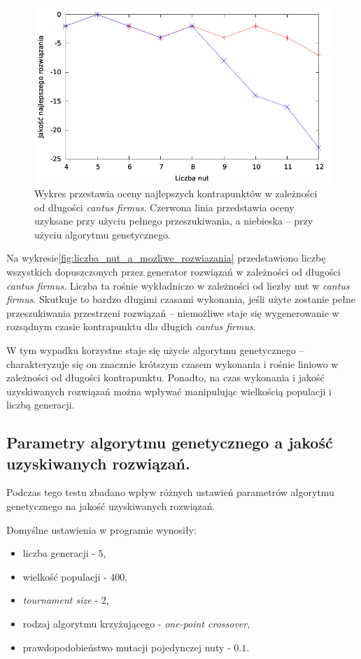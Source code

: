 \documentclass{article}
\begin{document}
\begin{figure}[htb]
\centering
\includegraphics[width=1.0\textwidth]{images/liczba_nut_a_jakosc.pdf}
\caption{Wykres przestawia oceny najlepszych kontrapunktów w zależności od długości \emph{cantus firmus}. Czerwona linia przedstawia oceny uzyksane przy użyciu pełnego przeszukiwania, a niebieska -- przy użyciu algorytmu genetycznego.}
\label{fig:liczba_nut_a_jakosc}
\end{figure}

Na wykresie\ref{fig:liczba_nut_a_mozliwe_rozwiazania} przedstawiono liczbę wszystkich dopuszczonych przez generator rozwiązań w zależności od długości \emph{cantus firmus}. Liczba ta rośnie wykładniczo w zależności od liczby nut w \emph{cantus firmus}. Skutkuje to bardzo długimi czasami wykonania, jeśli użyte zostanie pełne przeszukiwania przestrzeni rozwiązań -- niemożliwe staje się wygenerowanie w rozsądnym czasie kontrapunktu dla długich \emph{cantus firmus}.

W tym wypadku korzystne staje się użycie algorytmu genetycznego -- charakteryzuje się on znacznie krótszym czasem wykonania i rośnie liniowo w zależności od długości kontrapunktu. Ponadto, na czas wykonania i jakość uzyskiwanych rozwiązań można wpływać manipulując wielkością populacji i liczbą generacji.

\clearpage
\subsection{Parametry algorytmu genetycznego a jakość uzyskiwanych rozwiązań.}

Podczas tego testu zbadano wpływ różnych ustawień parametrów algorytmu genetycznego na jakość uzyskiwanych rozwiązań.

Domyślne ustawienia w programie wynosiły:
\begin{itemize}
\item liczba generacji - $5$,
\item wielkość populacji - $400$,
\item \emph{tournament size} - $2$,
\item rodzaj algorytmu krzyżującego - \emph{one-point crossover},
\item prawdopodobieństwo mutacji pojedynczej nuty - $0.1$.
\end{itemize}
\end{document}
